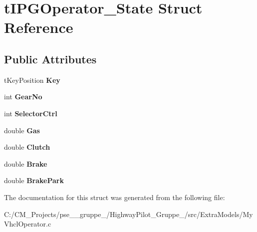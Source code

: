 \hypertarget{structt_i_p_g_operator___state}{}\section{t\+I\+P\+G\+Operator\+\_\+\+State Struct Reference}
\label{structt_i_p_g_operator___state}
\subsection*{Public Attributes}
\begin{DoxyCompactItemize}
\item 
\mbox{\label{structt_i_p_g_operator___state_a50edd28a491655ce739ad587ada9b0b4}} 
t\+Key\+Position {\bfseries Key}
\item 
\mbox{\label{structt_i_p_g_operator___state_a482ff146dc593f6245d2a3ac81768418}} 
int {\bfseries Gear\+No}
\item 
\mbox{\label{structt_i_p_g_operator___state_aa72086edafb6532ef3c4b3f17bbebbf5}} 
int {\bfseries Selector\+Ctrl}
\item 
\mbox{\label{structt_i_p_g_operator___state_a509ba77fb28b659a1285d49b7ecf7d1f}} 
double {\bfseries Gas}
\item 
\mbox{\label{structt_i_p_g_operator___state_a886c8e4b70fceaa4420dee9e3809459f}} 
double {\bfseries Clutch}
\item 
\mbox{\label{structt_i_p_g_operator___state_accd2d55426f75da4523110b52560369d}} 
double {\bfseries Brake}
\item 
\mbox{\label{structt_i_p_g_operator___state_a7a38d75a13af4b32e95aaac24bf7a33d}} 
double {\bfseries Brake\+Park}
\end{DoxyCompactItemize}


The documentation for this struct was generated from the following file\+:\begin{DoxyCompactItemize}
\item 
C\+:/\+C\+M\+\_\+\+Projects/pse\+\_\+\_\+gruppe\+\_/\+Highway\+Pilot\+\_\+\+Gruppe\+\_/src/\+Extra\+Models/My\+Vhcl\+Operator.\+c\end{DoxyCompactItemize}
